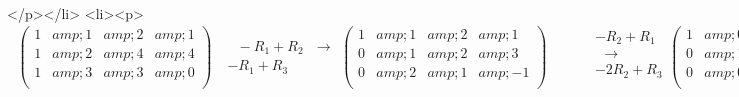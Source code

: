 </p></li>
<li><p>           \(\text{                   }\left(
\begin{array}{cccc}
 1 &amp; 1 &amp; 2 &amp; 1 \\
 1 &amp; 2 &amp; 4 &amp; 4 \\
 1 &amp; 3 &amp; 3 &amp; 0 \\
\end{array}
\right)\text{          }
\begin{array}{c}
   \\
 \text{  }-R_1+R_2\text{     }\to  \\
 -R_1+ R_3 \\
\end{array}
\left(
\begin{array}{cccc}
 1 &amp; 1 &amp; 2 &amp; 1 \\
 0 &amp; 1 &amp; 2 &amp; 3 \\
 0 &amp; 2 &amp; 1 &amp; -1 \\
\end{array}
\right) \quad \quad \quad 
\begin{array}{c}
 -R_2+ R_1 \\
 \text{                                   }\to  \\
 -2R_2+ R_3 \\
\end{array}
\left(
\begin{array}{cccc}
 1 &amp; 0 &amp; 0 &amp; -2 \\
 0 &amp; 1 &amp; 2 &amp; 3 \\
 0 &amp; 0 &amp; -3 &amp; -7 \\
\end{array}
\right) \quad \quad \quad 
\begin{array}{c}
   \\
 \text{                                  }\to  \\
 \text{     }\frac{-1}{3}R_3 \\
\end{array}
\left(
\begin{array}{cccc}
 1 &amp; 0 &amp; 0 &amp; -2 \\
 0 &amp; 1 &amp; 2 &amp; 3 \\
 0 &amp; 0 &amp; 1 &amp; \frac{7}{3} \\
\end{array}
\right) \text{$\quad \quad \quad $         }
\begin{array}{c}
   \\
 \frac{-1}{2}R_3+R_2\to  \\
   \\
\end{array}
\left(
\begin{array}{cccc}
 1 &amp; 0 &amp; 0 &amp; -2 \\
 0 &amp; 1 &amp; 2 &amp; 3 \\
 0 &amp; 0 &amp; 1 &amp; \frac{7}{3} \\
\end{array}
\right)\)



